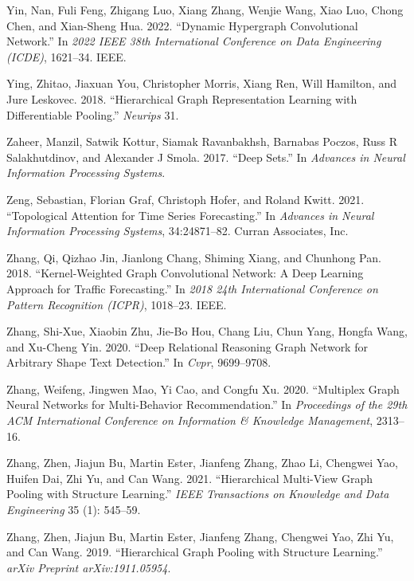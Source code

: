\documentclass[
  12pt,
]{krantz}
\newlength{\cslhangindent}
\newenvironment{CSLReferences}[2] %
 {\begin{list}{}{%
  \setlength{\itemindent}{0pt}
  \setlength{\leftmargin}{0pt}
  \setlength{\parsep}{0pt}
  \ifodd #1
   \setlength{\leftmargin}{\cslhangindent}
   \setlength{\itemindent}{-1\cslhangindent}
  \fi
  \setlength{\itemsep}{#2\baselineskip}}}
 {\end{list}}
\begin{document}
\begin{CSLReferences}{1}{0}
Yin, Nan, Fuli Feng, Zhigang Luo, Xiang Zhang, Wenjie Wang, Xiao Luo,
Chong Chen, and Xian-Sheng Hua. 2022. {``Dynamic Hypergraph
Convolutional Network.''} In \emph{2022 IEEE 38th International
Conference on Data Engineering (ICDE)}, 1621--34. IEEE.

Ying, Zhitao, Jiaxuan You, Christopher Morris, Xiang Ren, Will Hamilton,
and Jure Leskovec. 2018. {``Hierarchical Graph Representation Learning
with Differentiable Pooling.''} \emph{Neurips} 31.

Zaheer, Manzil, Satwik Kottur, Siamak Ravanbakhsh, Barnabas Poczos, Russ
R Salakhutdinov, and Alexander J Smola. 2017. {``Deep Sets.''} In
\emph{Advances in Neural Information Processing Systems}.

Zeng, Sebastian, Florian Graf, Christoph Hofer, and Roland Kwitt. 2021.
{``Topological Attention for Time Series Forecasting.''} In
\emph{Advances in {Neural} {Information} {Processing} {Systems}},
34:24871--82. Curran Associates, Inc.

Zhang, Qi, Qizhao Jin, Jianlong Chang, Shiming Xiang, and Chunhong Pan.
2018. {``Kernel-Weighted Graph Convolutional Network: A Deep Learning
Approach for Traffic Forecasting.''} In \emph{2018 24th International
Conference on Pattern Recognition (ICPR)}, 1018--23. IEEE.

Zhang, Shi-Xue, Xiaobin Zhu, Jie-Bo Hou, Chang Liu, Chun Yang, Hongfa
Wang, and Xu-Cheng Yin. 2020. {``Deep Relational Reasoning Graph Network
for Arbitrary Shape Text Detection.''} In \emph{Cvpr}, 9699--9708.

Zhang, Weifeng, Jingwen Mao, Yi Cao, and Congfu Xu. 2020. {``Multiplex
Graph Neural Networks for Multi-Behavior Recommendation.''} In
\emph{Proceedings of the 29th ACM International Conference on
Information \& Knowledge Management}, 2313--16.

Zhang, Zhen, Jiajun Bu, Martin Ester, Jianfeng Zhang, Zhao Li, Chengwei
Yao, Huifen Dai, Zhi Yu, and Can Wang. 2021. {``Hierarchical Multi-View
Graph Pooling with Structure Learning.''} \emph{IEEE Transactions on
Knowledge and Data Engineering} 35 (1): 545--59.

Zhang, Zhen, Jiajun Bu, Martin Ester, Jianfeng Zhang, Chengwei Yao, Zhi
Yu, and Can Wang. 2019. {``Hierarchical Graph Pooling with Structure
Learning.''} \emph{arXiv Preprint arXiv:1911.05954}.


\end{CSLReferences}
\end{document}
